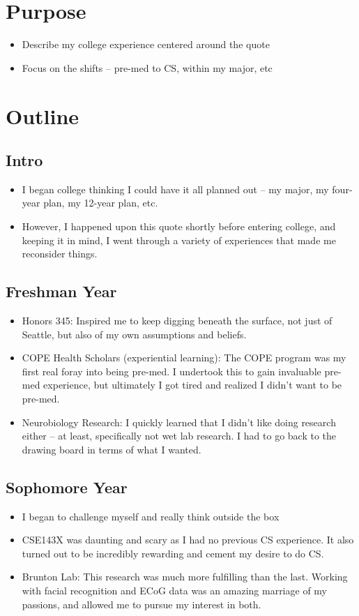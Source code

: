 \documentclass{article}
\begin{document}
\section{Purpose}
\begin{itemize}
    \item Describe my college experience centered around the quote
    \item Focus on the shifts -- pre-med to CS, within my major, etc
\end{itemize}

\section{Outline}
\subsection{Intro}
\begin{itemize}
    \item I began college thinking I could have it all planned out -- my major, my four-year plan, my 12-year plan, etc. 
    \item However, I happened upon this quote shortly before entering college, and keeping it in mind, I went through a variety of experiences that made me reconsider things.
\end{itemize}
\subsection{Freshman Year} 
\begin{itemize} 
    \item Honors 345: Inspired me to keep digging beneath the surface, not just of Seattle, but also of my own assumptions and beliefs.
    \item COPE Health Scholars (experiential learning): The COPE program was my first real foray into being pre-med. I undertook this to gain invaluable pre-med experience, but ultimately I got tired and realized I didn't want to be pre-med.
    \item Neurobiology Research: I quickly learned that I didn't like doing research either -- at least, specifically not wet lab research. I had to go back to the drawing board in terms of what I wanted.
\end{itemize}
\subsection{Sophomore Year}
\begin{itemize}
    \item I began to challenge myself and really think outside the box 
    \item CSE143X was daunting and scary as I had no previous CS experience. It also turned out to be incredibly rewarding and cement my desire to do CS.
    \item Brunton Lab: This research was much more fulfilling than the last. Working with facial recognition and ECoG data was an amazing marriage of my passions, and allowed me to pursue my interest in both.
\end{itemize}
\end{document}
